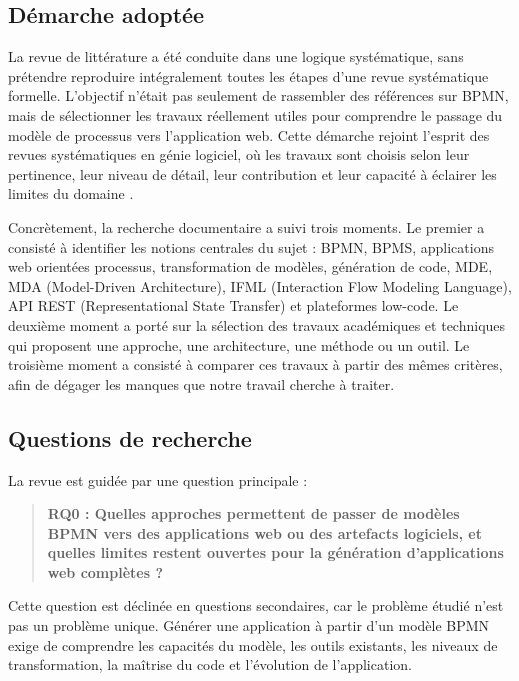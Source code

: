
\subsection{Démarche adoptée}

La revue de littérature a été conduite dans une logique systématique,
sans prétendre reproduire intégralement toutes les étapes d'une revue
systématique formelle. L'objectif n'était pas seulement de rassembler
des références sur BPMN, mais de sélectionner les travaux réellement
utiles pour comprendre le passage du modèle de processus vers
l'application web. Cette démarche rejoint l'esprit des revues
systématiques en génie logiciel, où les travaux sont choisis selon leur
pertinence, leur niveau de détail, leur contribution et leur capacité à
éclairer les limites du domaine \cite{kitchenham2007}.

Concrètement, la recherche documentaire a suivi trois moments. Le
premier a consisté à identifier les notions centrales du sujet : BPMN,
BPMS, applications web orientées processus, transformation de modèles,
génération de code, MDE, MDA (Model-Driven Architecture), IFML
(Interaction Flow Modeling Language), API REST (Representational State
Transfer) et plateformes low-code. Le deuxième moment a porté sur la
sélection des travaux académiques et techniques qui proposent une
approche, une architecture, une méthode ou un outil. Le troisième moment
a consisté à comparer ces travaux à partir des mêmes critères, afin de
dégager les manques que notre travail cherche à traiter.

\subsection{Questions de recherche}

La revue est guidée par une question principale :

\begin{quote}
\textbf{RQ0 : Quelles approches permettent de passer de modèles BPMN
vers des applications web ou des artefacts logiciels, et quelles limites
restent ouvertes pour la génération d'applications web complètes ?}
\end{quote}

Cette question est déclinée en questions secondaires, car le problème
étudié n'est pas un problème unique. Générer une application à partir
d'un modèle BPMN exige de comprendre les capacités du modèle, les outils
existants, les niveaux de transformation, la maîtrise du code et
l'évolution de l'application.

